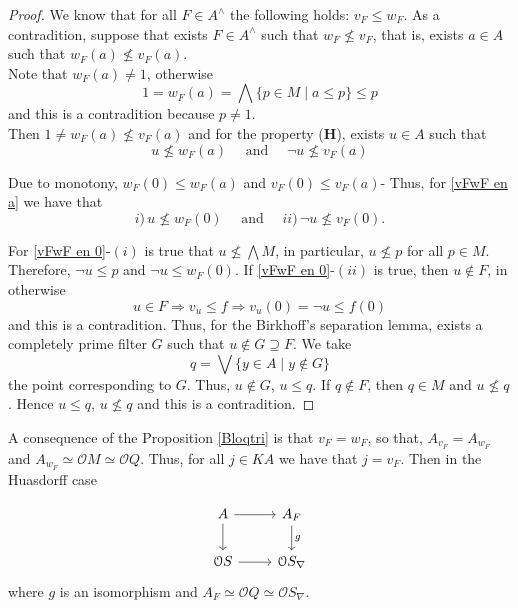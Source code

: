 \documentclass[11pt]{amsart}
\theoremstyle{plain}
\theoremstyle{definition}
\begin{document}
\begin{proof}
  We know that for all $F\in A^\wedge$ the following holds: $v_F\leq w_F$. As a contradition, suppose that exists $F\in A^\wedge$ such that $w_F\nleq v_F$, that is, exists $a\in A$ such that $w_F(a)\nleq v_F(a)$.\\

  Note that $w_F(a)\neq 1$, otherwise 
  \[
  1=w_F(a)=\bigwedge \{p\in M\mid a\leq p\}\leq p
  \]
  and this is a contradition because $p\neq 1$.\\

Then $1\neq w_F(a)\nleq v_F(a)$ and for the property ($\mathbf{H}$), exists $u\in A$ such that
\begin{equation}\label{vFwF en a}
u\nleq w_F(a)\quad \mbox{ and }\quad \neg u \nleq v_F(a)
\end{equation}

 Due to monotony, $w_F(0)\leq w_F(a)$ and $v_F(0)\leq v_F(a)$- Thus, for \ref{vFwF en a} we have that
\begin{equation}\label{vFwF en 0}
i)\,u\nleq w_F(0)\quad \mbox{ and }\quad ii)\,\neg u\nleq v_F(0).
\end{equation}

For \ref{vFwF en 0}-$(i)$ is true that $u\nleq \bigwedge M$, in particular, $u\nleq p$ for all $p\in M$. Therefore, $\neg u\leq p$ and $\neg u\leq w_F(0)$. If \ref{vFwF en 0}-$(ii)$ is true, then $u\notin F$, in otherwise 
\[
u\in F\Rightarrow v_u\leq f \Rightarrow v_u(0)=\neg u\leq f(0)
\] 
and this is a contradition. Thus, for the Birkhoff's separation lemma, exists a completely prime filter $G$ such that $u\notin G\supseteq F$. We take
\[
q=\bigvee \{y\in A\mid y\notin G\}
\]
the point corresponding to $G$. Thus, $u\notin G$, $u\leq q$. If $q\notin F$, then $q\in M$ and $u\nleq q$. Hence $u\leq q$, $u\nleq q$ and this is a contradition.
\end{proof}

A consequence of the Proposition \ref{Bloqtri} is that $v_F=w_F$, so that, $A_{v_F}=A_{w_F}$ and $A_{w_F}\simeq \mathcal{O}M\simeq \mathcal{O}Q$. Thus, for all $j\in KA$ we have that $j=v_F$. Then in the Huasdorff case

\[\begin{tikzcd}
	A & {A_F} \\
	{\mathcal{O}S} & {\mathcal{O}S_\nabla}
	\arrow[from=1-1, to=1-2]
	\arrow[from=1-1, to=2-1]
	\arrow["g", from=1-2, to=2-2]
	\arrow[from=2-1, to=2-2]
\end{tikzcd}
\]
where $g$ is an isomorphism and $A_F\simeq \mathcal{O}Q\simeq \mathcal{O}S_\nabla$.\\
\end{document}
